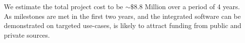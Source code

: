 
We estimate the total project cost to be $\sim\$8.8$ Million over a
period of 4 years. As milestones are met in the first two years, and
the integrated software can be demonstrated on targeted use-cases,
\pro is likely to attract funding from public and private
sources. %






